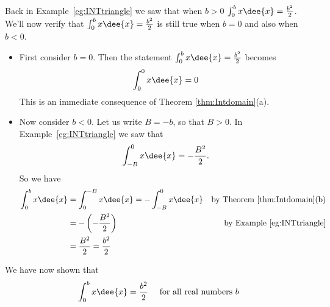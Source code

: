 \begin{eg}\label{eg:INTPROPxa}
Back in Example~\ref{eg:INTtriangle} we saw that when $b>0$
$\int_0^b x\dee{x} =\frac{b^2}{2}$. We'll now verify that
$\int_0^b x\dee{x} =\frac{b^2}{2}$ is still true when $b=0$ and
also when $b<0$.
\begin{itemize}
\item First consider $b=0$. Then the statement $\int_0^b x\dee{x}
=\frac{b^2}{2}$ becomes
\begin{align*}
\int_0^0 x\dee{x} =0
\end{align*}
This is an immediate consequence of Theorem \ref{thm:Intdomain}(a).
\item Now consider $b<0$. Let us write $B=-b$, so that $B>0$. In
Example~\ref{eg:INTtriangle} we saw that
\begin{align*}
\int_{-B}^0 x\dee{x} =-\frac{B^2}{2}.
\end{align*}
So we have
\begin{align*}
\int_0^b x\dee{x}
&=\int^{-B}_0 x\dee{x} =- \int_{-B}^0 x\dee{x} & \text{by
Theorem~\ref{thm:Intdomain}(b)}\\
& =-\left(-\frac{B^2}{2}\right) & \text{by Example~\ref{eg:INTtriangle}}\\
& =\frac{B^2}{2} = \frac{b^2}{2}
\end{align*}
\end{itemize}
We have now shown that
\begin{align*}
\int_0^b x\dee{x} &=\frac{b^2}{2} &\text{ for all real numbers $b$}
\end{align*}
\end{eg}

